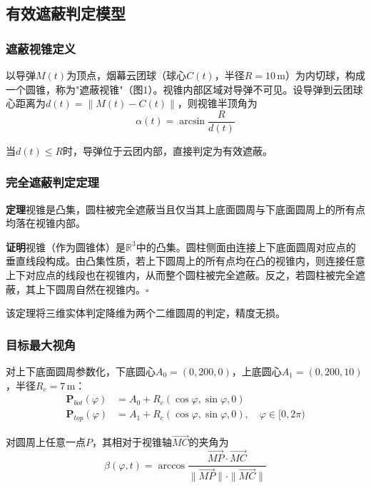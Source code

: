 \documentclass[12pt,a4paper]{article}
\begin{document}
\subsection{有效遮蔽判定模型}

\subsubsection{遮蔽视锥定义}

以导弹$M(t)$为顶点，烟幕云团球（球心$C(t)$，半径$R=10$\,m）为内切球，构成一个圆锥，称为"遮蔽视锥"（图1）。视锥内部区域对导弹不可见。设导弹到云团球心距离为$d(t) = \|M(t) - C(t)\|$，则视锥半顶角为
\begin{equation}
\alpha(t) = \arcsin\frac{R}{d(t)}
\end{equation}

当$d(t) \leq R$时，导弹位于云团内部，直接判定为有效遮蔽。

\subsubsection{完全遮蔽判定定理}

\textbf{定理}\quad 视锥是凸集，圆柱被完全遮蔽当且仅当其上底面圆周与下底面圆周上的所有点均落在视锥内部。

\textbf{证明}\quad 视锥（作为圆锥体）是$\mathbb{R}^3$中的凸集。圆柱侧面由连接上下底面圆周对应点的垂直线段构成。由凸集性质，若上下圆周上的所有点均在凸的视锥内，则连接任意上下对应点的线段也在视锥内，从而整个圆柱被完全遮蔽。反之，若圆柱被完全遮蔽，其上下圆周自然在视锥内。$\square$

该定理将三维实体判定降维为两个二维圆周的判定，精度无损。

\subsubsection{目标最大视角}

对上下底面圆周参数化，下底圆心$A_0 = (0, 200, 0)$，上底圆心$A_1 = (0, 200, 10)$，半径$R_c = 7$\,m：
\begin{align}
\mathbf{P}_{bot}(\varphi) &= A_0 + R_c(\cos\varphi, \sin\varphi, 0) \\
\mathbf{P}_{top}(\varphi) &= A_1 + R_c(\cos\varphi, \sin\varphi, 0), \quad \varphi \in [0, 2\pi)
\end{align}

对圆周上任意一点$P$，其相对于视锥轴$\overrightarrow{MC}$的夹角为
\begin{equation}
\beta(\varphi, t) = \arccos\frac{\overrightarrow{MP} \cdot \overrightarrow{MC}}{\|\overrightarrow{MP}\| \cdot \|\overrightarrow{MC}\|}
\end{equation}
\end{document}
